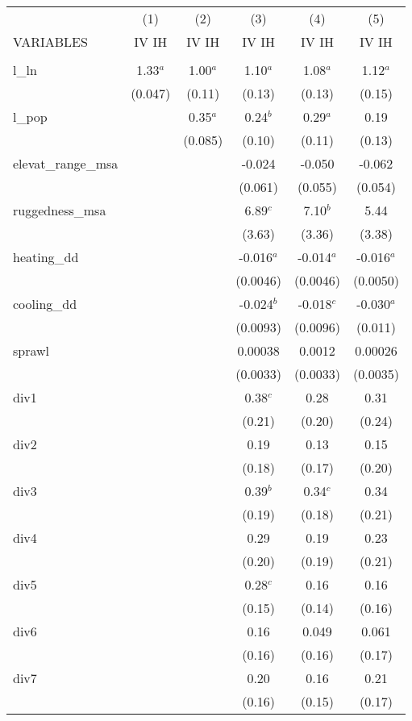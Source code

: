 \documentclass[]{article}
\begin{document}
\begin{tabular}{lccccc} \hline
 & (1) & (2) & (3) & (4) & (5) \\
VARIABLES & IV IH & IV IH & IV IH & IV IH & IV IH \\ \hline
 &  &  &  &  &  \\
l\_ln & 1.33$^a$ & 1.00$^a$ & 1.10$^a$ & 1.08$^a$ & 1.12$^a$ \\
 & (0.047) & (0.11) & (0.13) & (0.13) & (0.15) \\
l\_pop &  & 0.35$^a$ & 0.24$^b$ & 0.29$^a$ & 0.19 \\
 &  & (0.085) & (0.10) & (0.11) & (0.13) \\
elevat\_range\_msa &  &  & -0.024 & -0.050 & -0.062 \\
 &  &  & (0.061) & (0.055) & (0.054) \\
ruggedness\_msa &  &  & 6.89$^c$ & 7.10$^b$ & 5.44 \\
 &  &  & (3.63) & (3.36) & (3.38) \\
heating\_dd &  &  & -0.016$^a$ & -0.014$^a$ & -0.016$^a$ \\
 &  &  & (0.0046) & (0.0046) & (0.0050) \\
cooling\_dd &  &  & -0.024$^b$ & -0.018$^c$ & -0.030$^a$ \\
 &  &  & (0.0093) & (0.0096) & (0.011) \\
sprawl &  &  & 0.00038 & 0.0012 & 0.00026 \\
 &  &  & (0.0033) & (0.0033) & (0.0035) \\
div1 &  &  & 0.38$^c$ & 0.28 & 0.31 \\
 &  &  & (0.21) & (0.20) & (0.24) \\
div2 &  &  & 0.19 & 0.13 & 0.15 \\
 &  &  & (0.18) & (0.17) & (0.20) \\
div3 &  &  & 0.39$^b$ & 0.34$^c$ & 0.34 \\
 &  &  & (0.19) & (0.18) & (0.21) \\
div4 &  &  & 0.29 & 0.19 & 0.23 \\
 &  &  & (0.20) & (0.19) & (0.21) \\
div5 &  &  & 0.28$^c$ & 0.16 & 0.16 \\
 &  &  & (0.15) & (0.14) & (0.16) \\
div6 &  &  & 0.16 & 0.049 & 0.061 \\
 &  &  & (0.16) & (0.16) & (0.17) \\
div7 &  &  & 0.20 & 0.16 & 0.21 \\
 &  &  & (0.16) & (0.15) & (0.17) \\

\end{tabular}
\end{document}
